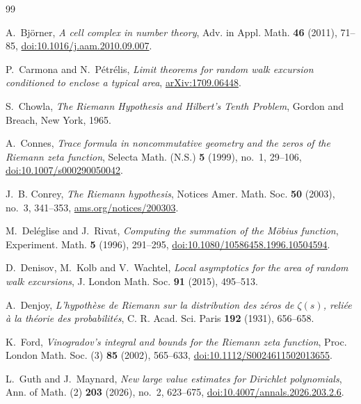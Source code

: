 \documentclass[11pt,reqno]{amsart}
\numberwithin{equation}{section}
\theoremstyle{plain}
\theoremstyle{definition}
\theoremstyle{remark}
\begin{document}
\begin{thebibliography}{99}

A.~Bj\"orner, \emph{A cell complex in number theory}, Adv. in Appl. Math.
\textbf{46} (2011), 71--85,
\href{https://doi.org/10.1016/j.aam.2010.09.007}{doi:10.1016/j.aam.2010.09.007}.

P.~Carmona and N.~P\'etr\'elis, \emph{Limit theorems for random walk excursion
conditioned to enclose a typical area},
\href{https://arxiv.org/abs/1709.06448}{arXiv:1709.06448}.

S.~Chowla, \emph{The Riemann Hypothesis and Hilbert's Tenth Problem}, Gordon
and Breach, New York, 1965.

A.~Connes, \emph{Trace formula in noncommutative geometry and the zeros of
the Riemann zeta function}, Selecta Math. (N.S.) \textbf{5} (1999), no.~1, 29--106,
\href{https://doi.org/10.1007/s000290050042}{doi:10.1007/s000290050042}.

J.~B. Conrey, \emph{The Riemann hypothesis}, Notices Amer. Math. Soc.
\textbf{50} (2003), no.~3, 341--353,
\href{https://www.ams.org/journals/notices/200303/fea-conrey-web.pdf}{ams.org/notices/200303}.

M.~Del\'eglise and J.~Rivat, \emph{Computing the summation of the M\"obius
function}, Experiment. Math. \textbf{5} (1996), 291--295,
\href{https://doi.org/10.1080/10586458.1996.10504594}{doi:10.1080/10586458.1996.10504594}.

D.~Denisov, M.~Kolb and V.~Wachtel, \emph{Local asymptotics for the area of
random walk excursions}, J. London Math. Soc. \textbf{91} (2015), 495--513.

A.~Denjoy, \emph{L'hypoth\`ese de Riemann sur la distribution des z\'eros de
$\zeta(s)$, reli\'ee \`a la th\'eorie des probabilit\'es}, C. R. Acad. Sci.
Paris \textbf{192} (1931), 656--658.

K.~Ford, \emph{Vinogradov's integral and bounds for the Riemann zeta
function}, Proc. London Math. Soc. (3) \textbf{85} (2002), 565--633,
\href{https://doi.org/10.1112/S0024611502013655}{doi:10.1112/S0024611502013655}.

L.~Guth and J.~Maynard, \emph{New large value estimates for Dirichlet
polynomials}, Ann. of Math. (2) \textbf{203} (2026), no.~2, 623--675,
\href{https://doi.org/10.4007/annals.2026.203.2.6}{doi:10.4007/annals.2026.203.2.6}.


\end{thebibliography}
\end{document}
